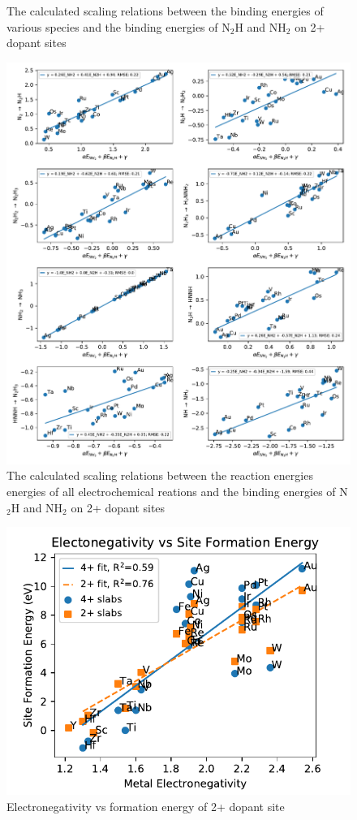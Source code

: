 \documentclass[journal=jacsat,manuscript=article]{achemso}
\begin{document}
\begin{figure}
\caption{The calculated scaling relations between the binding energies of various species and the binding energies of N$_2$H and NH$_2$ on 2+ dopant sites}
\label{fig:scaling_species}
\end{figure}

\begin{figure}
\centering
\includegraphics[width=0.8\linewidth]{Images/scaling_reactions.pdf}
\caption{The calculated scaling relations between the reaction energies energies of all electrochemical reations and the binding energies of N$_2$H and NH$_2$ on 2+ dopant sites}
\label{fig:scaling_reactions}
\end{figure}

\begin{figure}
\centering
\includegraphics[width=0.8\linewidth]{Images/electronegativity_vs_formation.pdf}
\caption{Electronegativity vs formation energy of 2+ dopant site}
\label{fig:electronegativity}
\end{figure}
\end{document}
